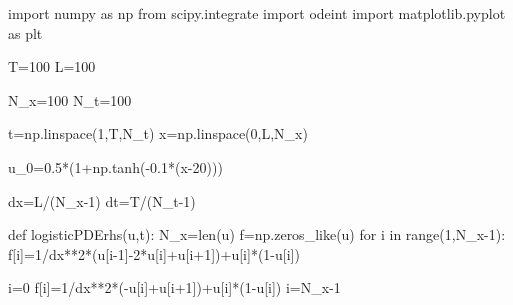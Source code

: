 \documentclass[
  letterpaper,
  DIV=11,
  numbers=noendperiod]{scrreprt}
\newenvironment{Shaded}{\begin{snugshade}}{\end{snugshade}}
\newcommand{\BuiltInTok}[1]{\textcolor[rgb]{0.00,0.23,0.31}{#1}}
\newcommand{\ControlFlowTok}[1]{\textcolor[rgb]{0.00,0.23,0.31}{#1}}
\newcommand{\DecValTok}[1]{\textcolor[rgb]{0.68,0.00,0.00}{#1}}
\newcommand{\FloatTok}[1]{\textcolor[rgb]{0.68,0.00,0.00}{#1}}
\newcommand{\ImportTok}[1]{\textcolor[rgb]{0.00,0.46,0.62}{#1}}
\newcommand{\KeywordTok}[1]{\textcolor[rgb]{0.00,0.23,0.31}{#1}}
\newcommand{\NormalTok}[1]{\textcolor[rgb]{0.00,0.23,0.31}{#1}}
\newcommand{\OperatorTok}[1]{\textcolor[rgb]{0.37,0.37,0.37}{#1}}
\theoremstyle{plain}
\theoremstyle{definition}
\theoremstyle{plain}
\theoremstyle{remark}
\begin{document}
\begin{Shaded}
\begin{Highlighting}[]
\ImportTok{import}\NormalTok{ numpy }\ImportTok{as}\NormalTok{ np}
\ImportTok{from}\NormalTok{ scipy.integrate }\ImportTok{import}\NormalTok{ odeint}
\ImportTok{import}\NormalTok{ matplotlib.pyplot }\ImportTok{as}\NormalTok{ plt}

\NormalTok{T}\OperatorTok{=}\DecValTok{100}
\NormalTok{L}\OperatorTok{=}\DecValTok{100}

\NormalTok{N\_x}\OperatorTok{=}\DecValTok{100}
\NormalTok{N\_t}\OperatorTok{=}\DecValTok{100}

\NormalTok{t}\OperatorTok{=}\NormalTok{np.linspace(}\DecValTok{1}\NormalTok{,T,N\_t)}
\NormalTok{x}\OperatorTok{=}\NormalTok{np.linspace(}\DecValTok{0}\NormalTok{,L,N\_x)}


\NormalTok{u\_0}\OperatorTok{=}\FloatTok{0.5}\OperatorTok{*}\NormalTok{(}\DecValTok{1}\OperatorTok{+}\NormalTok{np.tanh(}\OperatorTok{{-}}\FloatTok{0.1}\OperatorTok{*}\NormalTok{(x}\OperatorTok{{-}}\DecValTok{20}\NormalTok{)))}

\NormalTok{dx}\OperatorTok{=}\NormalTok{L}\OperatorTok{/}\NormalTok{(N\_x}\OperatorTok{{-}}\DecValTok{1}\NormalTok{)}
\NormalTok{dt}\OperatorTok{=}\NormalTok{T}\OperatorTok{/}\NormalTok{(N\_t}\OperatorTok{{-}}\DecValTok{1}\NormalTok{)}


\KeywordTok{def}\NormalTok{ logisticPDErhs(u,t):}
\NormalTok{    N\_x}\OperatorTok{=}\BuiltInTok{len}\NormalTok{(u)}
\NormalTok{    f}\OperatorTok{=}\NormalTok{np.zeros\_like(u)}
    \ControlFlowTok{for}\NormalTok{ i }\KeywordTok{in} \BuiltInTok{range}\NormalTok{(}\DecValTok{1}\NormalTok{,N\_x}\OperatorTok{{-}}\DecValTok{1}\NormalTok{):}
\NormalTok{      f[i]}\OperatorTok{=}\DecValTok{1}\OperatorTok{/}\NormalTok{dx}\OperatorTok{**}\DecValTok{2}\OperatorTok{*}\NormalTok{(u[i}\OperatorTok{{-}}\DecValTok{1}\NormalTok{]}\OperatorTok{{-}}\DecValTok{2}\OperatorTok{*}\NormalTok{u[i]}\OperatorTok{+}\NormalTok{u[i}\OperatorTok{+}\DecValTok{1}\NormalTok{])}\OperatorTok{+}\NormalTok{u[i]}\OperatorTok{*}\NormalTok{(}\DecValTok{1}\OperatorTok{{-}}\NormalTok{u[i])  }


\NormalTok{    i}\OperatorTok{=}\DecValTok{0}
\NormalTok{    f[i]}\OperatorTok{=}\DecValTok{1}\OperatorTok{/}\NormalTok{dx}\OperatorTok{**}\DecValTok{2}\OperatorTok{*}\NormalTok{(}\OperatorTok{{-}}\NormalTok{u[i]}\OperatorTok{+}\NormalTok{u[i}\OperatorTok{+}\DecValTok{1}\NormalTok{])}\OperatorTok{+}\NormalTok{u[i]}\OperatorTok{*}\NormalTok{(}\DecValTok{1}\OperatorTok{{-}}\NormalTok{u[i]) }
\NormalTok{    i}\OperatorTok{=}\NormalTok{N\_x}\OperatorTok{{-}}\DecValTok{1}


\end{Highlighting}
\end{Shaded}
\end{document}
